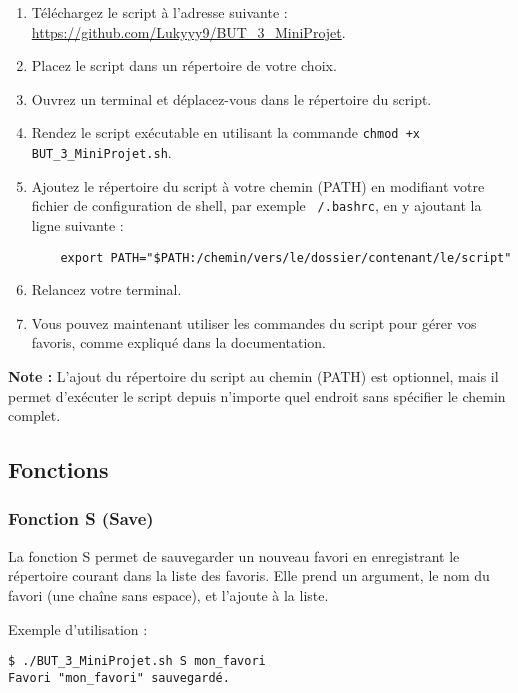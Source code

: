 \documentclass[a4paper, 12pt]{article}
\begin{document}
\begin{enumerate}
    \item Téléchargez le script à l'adresse suivante : \url{https://github.com/Lukyyy9/BUT_3_MiniProjet}.
    
    \item Placez le script dans un répertoire de votre choix.
    
    \item Ouvrez un terminal et déplacez-vous dans le répertoire du script.
    
    \item Rendez le script exécutable en utilisant la commande \texttt{chmod +x BUT_3_MiniProjet.sh}.

    \item Ajoutez le répertoire du script à votre chemin (PATH) en modifiant votre fichier de configuration de shell, par exemple \texttt{~/.bashrc}, en y ajoutant la ligne suivante :

    \begin{verbatim}
    export PATH="$PATH:/chemin/vers/le/dossier/contenant/le/script"
    \end{verbatim}

    \item Relancez votre terminal.

    \item Vous pouvez maintenant utiliser les commandes du script pour gérer vos favoris, comme expliqué dans la documentation.

\end{enumerate}

\textbf{Note :} L'ajout du répertoire du script au chemin (PATH) est optionnel, mais il permet d'exécuter le script depuis n'importe quel endroit sans spécifier le chemin complet.

\subsection{Fonctions}
\subsubsection{Fonction S (Save)}
La fonction S permet de sauvegarder un nouveau favori en enregistrant le répertoire courant dans la liste des favoris. Elle prend un argument, le nom du favori (une chaîne sans espace), et l'ajoute à la liste.

Exemple d'utilisation :
\begin{lstlisting}[style=mystyle]
$ ./BUT_3_MiniProjet.sh S mon_favori
Favori "mon_favori" sauvegardé.
\end{lstlisting}
\end{document}
